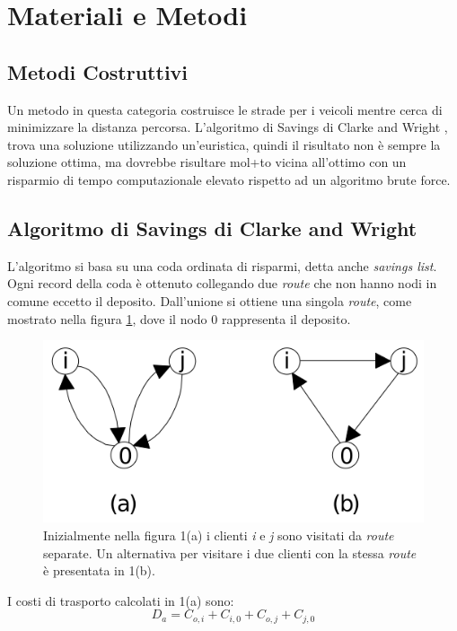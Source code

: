 \documentclass[]{article}
\begin{document}
\section{Materiali e Metodi}
\subsection{Metodi Costruttivi}
Un metodo in questa categoria costruisce le strade per i veicoli mentre cerca di minimizzare la distanza percorsa.
L'algoritmo di Savings di Clarke and Wright \cite{CK1}, trova una soluzione utilizzando un'euristica, quindi il risultato non è sempre la soluzione ottima, ma dovrebbe risultare mol+to vicina all'ottimo con un risparmio di tempo computazionale elevato rispetto ad un algoritmo brute force.


\subsection{Algoritmo di Savings di Clarke and Wright}
L'algoritmo si basa su una coda ordinata di risparmi, detta anche \emph{savings list}.
Ogni record della coda è ottenuto collegando due \emph{route} che non hanno nodi in comune eccetto il deposito.
Dall'unione si ottiene una singola \emph{route}, come mostrato nella figura \ref{fig:saving}, dove il nodo 0 rappresenta il deposito.

\begin{figure}[h!]
	\centering
	\includegraphics[scale=0.25]{images/saving.png}
	\caption{Inizialmente nella figura 1(a) i clienti \emph{i} e \emph{j} sono visitati da \emph{route} separate. Un alternativa per visitare i due clienti con la stessa \emph{route} è presentata in 1(b). }
	\label{fig:saving}
\end{figure}

I costi di trasporto calcolati in 1(a) sono:
\begin{equation}
D_{a} = C_{o,i} +C_{i,0} + C_{o,j} + C_{j,0}
\end{equation}
\end{document}
